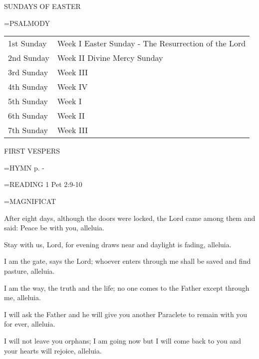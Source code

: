 \begin{center}\normalsize SUNDAYS OF EASTER\\
\end{center}

\hangindent=\parindent \small{PSALMODY}
\begin{center}
\begin{tabular}{ l l }
1st Sunday &  Week I Easter Sunday - The Resurrection of the Lord\\
2nd Sunday &  Week II Divine Mercy Sunday\\
3rd Sunday &  Week III\\
4th Sunday &  Week IV\\
5th Sunday &  Week I\\
6th Sunday &  Week II\\
7th Sunday &  Week III\\
\end{tabular}
\end{center}		

\begin{flushleft}\normalsize FIRST VESPERS\\\end{flushleft}

\hangindent=\parindent \small{\uppercase{HYMN} p.  \pageref{easter:firstHymn} - \pageref{easter:lastHymn}\\}

\hangindent=\parindent \small{READING}    1 Pet 2:9-10 \textbf{   \\}

\hangindent=\parindent \small MAGNIFICAT
\begin{description}[labelindent=\parindent, noitemsep, leftmargin=*]
\item [Divine Mercy Sunday:] 	After eight days, although the doors were locked, the Lord came among them and said: Peace be with you, alleluia.
\item [3rd Week:] 	Stay with us, Lord, for evening draws near and daylight is fading, alleluia.
\item [4th Week:] 	I am the gate, says the Lord; whoever enters through me shall be saved and find pasture, alleluia.
\item [5th Week:] 	I am the way, the truth and the life; no one comes to the Father except through me, alleluia.
\item [6th Week:] 	I will ask the Father and he will give you another Paraclete to remain with you for ever, alleluia.
\item [7th Week:] 	I will not leave you orphans; I am going now but I will come back to you and your hearts will rejoice, alleluia.
\end{description}

